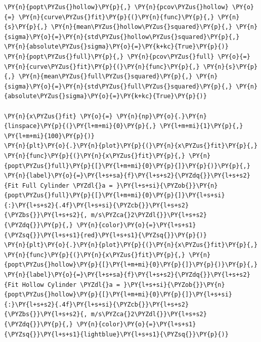 \begin{tcolorbox}[breakable, size=fbox, boxrule=1pt, pad at break*=1mm,colback=cellbackground, colframe=cellborder]
\begin{Verbatim}[commandchars=\\\{\}]
\PY{n}{popt\PYZus{}hollow}\PY{p}{,} \PY{n}{pcov\PYZus{}hollow} \PY{o}{=} \PY{n}{curve\PYZus{}fit}\PY{p}{(}\PY{n}{func}\PY{p}{,} \PY{n}{s}\PY{p}{,} \PY{n}{mean\PYZus{}hollow\PYZus{}squared}\PY{p}{,} \PY{n}{sigma}\PY{o}{=}\PY{n}{std\PYZus{}hollow\PYZus{}squared}\PY{p}{,} \PY{n}{absolute\PYZus{}sigma}\PY{o}{=}\PY{k+kc}{True}\PY{p}{)}
\PY{n}{popt\PYZus{}full}\PY{p}{,} \PY{n}{pcov\PYZus{}full} \PY{o}{=} \PY{n}{curve\PYZus{}fit}\PY{p}{(}\PY{n}{func}\PY{p}{,} \PY{n}{s}\PY{p}{,} \PY{n}{mean\PYZus{}full\PYZus{}squared}\PY{p}{,} \PY{n}{sigma}\PY{o}{=}\PY{n}{std\PYZus{}full\PYZus{}squared}\PY{p}{,} \PY{n}{absolute\PYZus{}sigma}\PY{o}{=}\PY{k+kc}{True}\PY{p}{)}

\PY{n}{x\PYZus{}fit} \PY{o}{=} \PY{n}{np}\PY{o}{.}\PY{n}{linspace}\PY{p}{(}\PY{l+m+mi}{0}\PY{p}{,} \PY{l+m+mi}{1}\PY{p}{,} \PY{l+m+mi}{100}\PY{p}{)}
\PY{n}{plt}\PY{o}{.}\PY{n}{plot}\PY{p}{(}\PY{n}{x\PYZus{}fit}\PY{p}{,} \PY{n}{func}\PY{p}{(}\PY{n}{x\PYZus{}fit}\PY{p}{,} \PY{n}{popt\PYZus{}full}\PY{p}{[}\PY{l+m+mi}{0}\PY{p}{]}\PY{p}{)}\PY{p}{,} \PY{n}{label}\PY{o}{=}\PY{l+s+sa}{f}\PY{l+s+s2}{\PYZdq{}}\PY{l+s+s2}{Fit Full Cylinder \PYZdl{}a = }\PY{l+s+si}{\PYZob{}}\PY{n}{popt\PYZus{}full}\PY{p}{[}\PY{l+m+mi}{0}\PY{p}{]}\PY{l+s+si}{:}\PY{l+s+s2}{.4f}\PY{l+s+si}{\PYZcb{}}\PY{l+s+s2}{\PYZbs{}}\PY{l+s+s2}{, m/s\PYZca{}2\PYZdl{}}\PY{l+s+s2}{\PYZdq{}}\PY{p}{,} \PY{n}{color}\PY{o}{=}\PY{l+s+s1}{\PYZsq{}}\PY{l+s+s1}{red}\PY{l+s+s1}{\PYZsq{}}\PY{p}{)}
\PY{n}{plt}\PY{o}{.}\PY{n}{plot}\PY{p}{(}\PY{n}{x\PYZus{}fit}\PY{p}{,} \PY{n}{func}\PY{p}{(}\PY{n}{x\PYZus{}fit}\PY{p}{,} \PY{n}{popt\PYZus{}hollow}\PY{p}{[}\PY{l+m+mi}{0}\PY{p}{]}\PY{p}{)}\PY{p}{,} \PY{n}{label}\PY{o}{=}\PY{l+s+sa}{f}\PY{l+s+s2}{\PYZdq{}}\PY{l+s+s2}{Fit Hollow Cylinder \PYZdl{}a = }\PY{l+s+si}{\PYZob{}}\PY{n}{popt\PYZus{}hollow}\PY{p}{[}\PY{l+m+mi}{0}\PY{p}{]}\PY{l+s+si}{:}\PY{l+s+s2}{.4f}\PY{l+s+si}{\PYZcb{}}\PY{l+s+s2}{\PYZbs{}}\PY{l+s+s2}{, m/s\PYZca{}2\PYZdl{}}\PY{l+s+s2}{\PYZdq{}}\PY{p}{,} \PY{n}{color}\PY{o}{=}\PY{l+s+s1}{\PYZsq{}}\PY{l+s+s1}{lightblue}\PY{l+s+s1}{\PYZsq{}}\PY{p}{)}


\end{Verbatim}
\end{tcolorbox}
